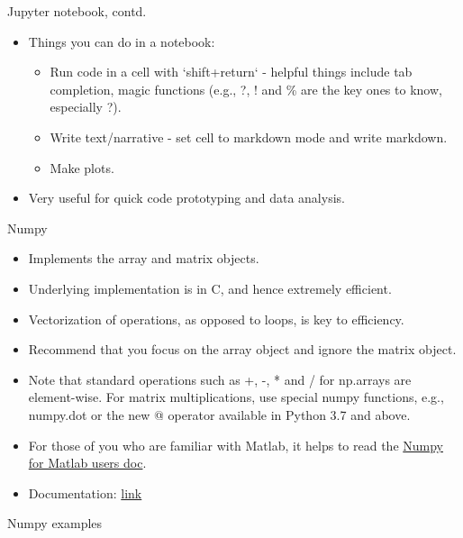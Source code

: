 \documentclass[aspectratio=169]{beamer}
\begin{document}
    \begin{frame}{Jupyter notebook, contd.}
        \begin{itemize}
            \item Things you can do in a notebook:
            \begin{itemize}
                \item Run code in a cell with `shift+return` - helpful things include tab completion, magic functions (e.g., ?, ! and \% are the key ones to know, especially ?).
                \item Write text/narrative - set cell to markdown mode and write markdown.
                \item Make plots.
            \end{itemize}
            \item Very useful for quick code prototyping and data analysis.
        \end{itemize}
    \end{frame}


    \begin{frame}{Numpy}
        \begin{itemize}
            \item Implements the array and matrix objects.
            \item Underlying implementation is in C, and hence extremely efficient.
            \item Vectorization of operations, as opposed to loops, is key to efficiency.
            \item Recommend that you focus on the array object and ignore the matrix object.
            \item Note that standard operations such as +, -, * and / for np.arrays are element-wise. For matrix multiplications, use special numpy functions, e.g., numpy.dot or the new @ operator available in Python 3.7 and above.
            \item For those of you who are familiar with Matlab, it helps to read the \href{http://numpy.org/doc/stable/user/numpy-for-matlab-users.html}{Numpy for Matlab users doc}.
            \item Documentation: \href{http://numpy.org/doc/stable/}{link}
        \end{itemize}
    \end{frame}


    \begin{frame}[fragile]{Numpy examples}
        \inputminted{python}{example_numpy.py}
    \end{frame}
\end{document}
